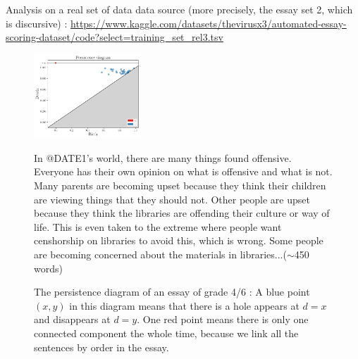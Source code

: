 \documentclass{beamer}
\begin{document}
\begin{frame}{Analysis on a real set of data}
data source (more precisely, the essay set 2, which is discursive) :
\fontsize{7pt}{8pt}\selectfont
\url{https://www.kaggle.com/datasets/thevirusx3/automated-essay-scoring-dataset/code?select=training_set_rel3.tsv}
\begin{figure}[H]
\begin{minipage}{0.49\linewidth}
\includegraphics[width=4cm]{pdessay.png}
\end{minipage}
\begin{minipage}{0.49\linewidth}
\begin{mdframed}
In @DATE1's world, there are many things found offensive.  Everyone has their own opinion on what is offensive and what is not. Many parents are becoming upset because they think their children are viewing things that they should not.  Other people are upset because they think the libraries are offending their culture or way of life.  This is even taken to the extreme where people want censhorship on libraries to avoid this, which is wrong.     Some people are becoming concerned about the materials in libraries...($\sim$450 words)
\end{mdframed}
\end{minipage}
\caption{The persistence diagram of an essay of grade 4/6 : A blue point $(x, y)$ in this diagram means
that there is a hole appears at $d=x$ and disappears at $d=y$.
One red point means there is only one connected component the whole time,
because we link all the sentences by order in the essay.
}
\label{fig:pd}
\end{figure}
\end{frame}
\end{document}
